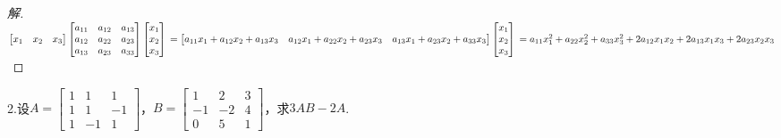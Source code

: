 \documentclass[10pt,a4paper]{report}
\begin{document}
\begin{proof}[解]
	$
	\left[
	\begin{matrix}
	x_{1} & x_{2} & x_{3} 
	\end{matrix}
	\right] 
	\left[
	\begin{matrix}
	a_{11} & a_{12} & a_{13} \\
	a_{12} & a_{22} & a_{23} \\
	a_{13} & a_{23} & a_{33}
	\end{matrix}
	\right]
	\left[
	\begin{matrix}
	x_{1} \\
	x_{2} \\
	x_{3}
	\end{matrix}
	\right] \\
	= \left[
	\begin{matrix}
	a_{11}x_{1}+a_{12}x_{2}+a_{13}x_{3} & a_{12}x_{1}+a_{22}x_{2}+a_{23}x_{3} & a_{13}x_{1}+a_{23}x_{2}+a_{33}x_{3}
	\end{matrix}
	\right]
	\left[
	\begin{matrix}
	x_{1} \\
	x_{2} \\
	x_{3}
	\end{matrix}
	\right] \\
	= a_{11}x_{1}^{2} + a_{22}x_{2}^{2} + a_{33}x_{3}^{2} + 2a_{12}x_{1}x_{2} + 2a_{13}x_{1}x_{3} + 2a_{23}x_{2}x_{3}
	$
\end{proof}
\noindent 2.设$A = \left[
\begin{matrix}
1 & 1 & 1 \\
1 & 1 & -1 \\
1 & -1 & 1 
\end{matrix}
\right]$，$B = \left[
\begin{matrix}
1 & 2 & 3 \\
-1 & -2 & 4 \\
0 & 5 & 1 
\end{matrix}
\right]$，求$3AB-2A$.
\end{document}
